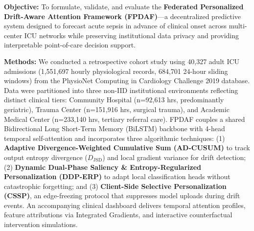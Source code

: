 \documentclass[11pt,a4paper]{article}
\begin{document}
\textbf{Objective:} To formulate, validate, and evaluate the \textbf{Federated Personalized Drift-Aware Attention Framework (FPDAF)}---a decentralized predictive system designed to forecast acute sepsis in advance of clinical onset across multi-center ICU networks while preserving institutional data privacy and providing interpretable point-of-care decision support.

\textbf{Methods:} We conducted a retrospective cohort study using 40,327 adult ICU admissions (1,551,697 hourly physiological records, 684,701 24-hour sliding windows) from the PhysioNet Computing in Cardiology Challenge 2019 database. Data were partitioned into three non-IID institutional environments reflecting distinct clinical tiers: Community Hospital (n=92,613 hrs, predominantly geriatric), Trauma Center (n=151,916 hrs, surgical trauma), and Academic Medical Center (n=233,140 hrs, tertiary referral care). FPDAF couples a shared Bidirectional Long Short-Term Memory (BiLSTM) backbone with 4-head temporal self-attention and incorporates three algorithmic techniques: (1) \textbf{Adaptive Divergence-Weighted Cumulative Sum (AD-CUSUM)} to track output entropy divergence ($D_{\text{JSD}}$) and local gradient variance for drift detection; (2) \textbf{Dynamic Dual-Phase Saliency \& Entropy-Regularized Personalization (DDP-ERP)} to adapt local classification heads without catastrophic forgetting; and (3) \textbf{Client-Side Selective Personalization (CSSP)}, an edge-freezing protocol that suppresses model uploads during drift events. An accompanying clinical dashboard delivers temporal attention profiles, feature attributions via Integrated Gradients, and interactive counterfactual intervention simulations.
\end{document}

